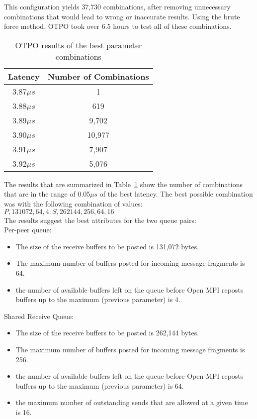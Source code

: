 This configuration yields 37,730 combinations, after removing
unnecessary combinations that would lead to wrong or inaccurate
results.  Using the brute force method, OTPO took over 6.5 hours to
test all of these combinations.

\begin{table}[tb]
\centering
\begin{tabular}{|c|c|} \hline
Latency & Number of Combinations \\
\hline
3.87$\mu s$  & 1\\
\hline
3.88$\mu s$  & 619\\
\hline
3.89$\mu s$  & 9,702\\
\hline
3.90$\mu s$  & 10,977\\
\hline
3.91$\mu s$  & 7,907\\
\hline
3.92$\mu s$  & 5,076\\
\hline
\end{tabular}  
\caption{OTPO results of the best parameter combinations}
\label{table:results} 
\end{table}

The results that are summarized in Table~\ref{table:results} show the
number of combinations that are in the range of 0.05$\mu s$ of the
best latency. The best possible combination was with the following
combination of values:
$P,131072,64,4:S,262144,256,64,16$\\
The results suggest the best attributes for the two queue pairs:\\
Per-peer queue:
\begin{itemize}
\item The size of the receive buffers to be posted is 131,072 bytes.
\item The maximum number of buffers posted for incoming message
  fragments is 64.
\item the number of available buffers left on the queue before Open
  MPI reposts buffers up to the maximum (previous parameter) is 4.
\end{itemize}
Shared Receive Queue:
\begin{itemize}
\item The size of the receive buffers to be posted is 262,144 bytes.
\item The maximum number of buffers posted for incoming message
  fragments is 256.
\item the number of available buffers left on the queue before Open
  MPI reposts buffers up to the maximum (previous parameter) is 64.
\item the maximum number of outstanding sends that are allowed at a
  given time is 16.
\end{itemize}


